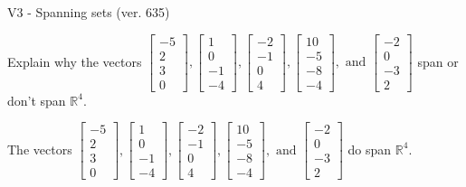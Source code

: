 \begin{exercise}
  \begin{exerciseTitle}V3 - Spanning sets (ver. 635)\end{exerciseTitle}
  \begin{exerciseStatement}
    Explain why the vectors \(\left[\begin{array}{r}
-5 \\
2 \\
3 \\
0
\end{array}\right] , \left[\begin{array}{r}
1 \\
0 \\
-1 \\
-4
\end{array}\right] , \left[\begin{array}{r}
-2 \\
-1 \\
0 \\
4
\end{array}\right] , \left[\begin{array}{r}
10 \\
-5 \\
-8 \\
-4
\end{array}\right] , \text{ and } \left[\begin{array}{r}
-2 \\
0 \\
-3 \\
2
\end{array}\right]\) span or don't span \(\mathbb{R}^4\). 
	


  \end{exerciseStatement}
  \begin{exerciseAnswer}
   The vectors \(\left[\begin{array}{r}
-5 \\
2 \\
3 \\
0
\end{array}\right] , \left[\begin{array}{r}
1 \\
0 \\
-1 \\
-4
\end{array}\right] , \left[\begin{array}{r}
-2 \\
-1 \\
0 \\
4
\end{array}\right] , \left[\begin{array}{r}
10 \\
-5 \\
-8 \\
-4
\end{array}\right] , \text{ and } \left[\begin{array}{r}
-2 \\
0 \\
-3 \\
2
\end{array}\right]\) 
  	 do  
	span \(\mathbb{R}^4\).
  



\end{exerciseAnswer}
\end{exercise}
